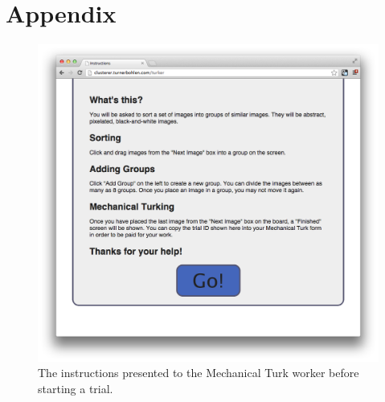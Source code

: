 \appendix
\section{Appendix}
\begin{figure}[h!]
\centering
\includegraphics[width=5.6in]{img/instructions.png}
\caption{The instructions presented to the Mechanical Turk worker before
  starting a trial.}
\label{fig:instructions}
\end{figure}
